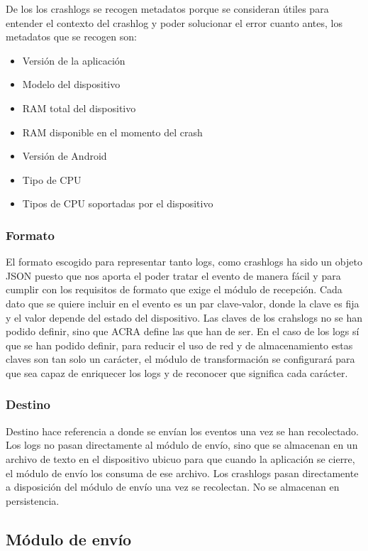 De los los crashlogs se recogen metadatos porque se consideran útiles para entender el contexto del crashlog y poder solucionar el error cuanto antes, los metadatos que se recogen son:

\begin{itemize}
	\item Versión de la aplicación
	\item Modelo del dispositivo
	\item RAM total del dispositivo
	\item RAM disponible en el momento del crash
	\item Versión de Android
	\item Tipo de CPU
	\item Tipos de CPU soportadas por el dispositivo
\end{itemize}

\subsubsection{Formato}
El formato escogido para representar tanto logs, como crashlogs ha sido un objeto JSON puesto que nos aporta el poder tratar el evento de manera fácil y para cumplir con los requisitos de formato que exige el módulo de recepción. Cada dato que se quiere incluir en el evento es un par clave-valor, donde la clave es fija y el valor depende del estado del dispositivo. Las claves de los crahslogs no se han podido definir, sino que ACRA define las que han de ser. En el caso de los logs sí que se han podido definir, para reducir el uso de red y de almacenamiento estas claves son tan solo un carácter, el módulo de transformación se configurará para que sea capaz de enriquecer los logs y de reconocer que significa cada carácter. 

\subsubsection{Destino}
Destino hace referencia a donde se envían los eventos una vez se han recolectado. 
Los logs no pasan directamente al módulo de envío, sino que se almacenan en un archivo de texto en el dispositivo ubicuo para que cuando la aplicación se cierre, el módulo de envío los consuma de ese archivo.
Los crashlogs pasan directamente a disposición del módulo de envío una vez se recolectan. No se almacenan en persistencia. 

\subsection{Módulo de envío}

